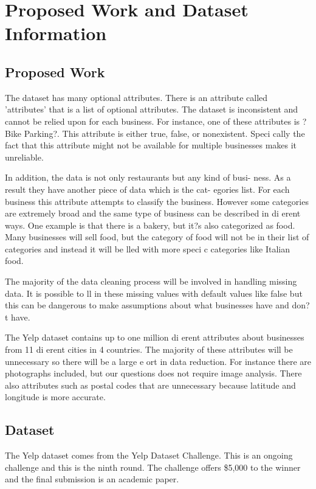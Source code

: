 \section{Proposed Work and Dataset Information}

\subsection{Proposed Work}

The dataset has many optional attributes. There is an attribute called 'attributes' that is a list of optional attributes. The dataset is inconsistent and cannot be relied upon for each business. For instance, one of these attributes is ?Bike Parking?. This attribute is either true, false, or nonexistent. Speci cally the fact that this attribute might not be available for multiple businesses makes it unreliable.

\quad In addition, the data is not only restaurants but any kind of busi- ness. As a result they have another piece of data which is the cat- egories list. For each business this attribute attempts to classify the business. However some categories are extremely broad and the same type of business can be described in di erent ways. One example is that there is a bakery, but it?s also categorized as food. Many businesses will sell food, but the category of food will not be in their list of categories and instead it will be  lled with more speci c categories like Italian food.

\quad The majority of the data cleaning process will be involved in handling missing data. It is possible to  ll in these missing values with default values like false but this can be dangerous to make assumptions about what businesses have and don?t have.

\quad The Yelp dataset contains up to one million di erent attributes about businesses from 11 di erent cities in 4 countries. The majority of these attributes will be unnecessary so there will be a large e ort in data reduction. For instance there are photographs included, but our questions does not require image analysis. There also attributes such as postal codes that are unnecessary because latitude and longitude is more accurate.

\subsection{Dataset}

The Yelp dataset comes from the Yelp Dataset Challenge. This is an ongoing challenge and this is the ninth round. The challenge offers \$5,000 to the winner and the  final submission is an academic paper.

